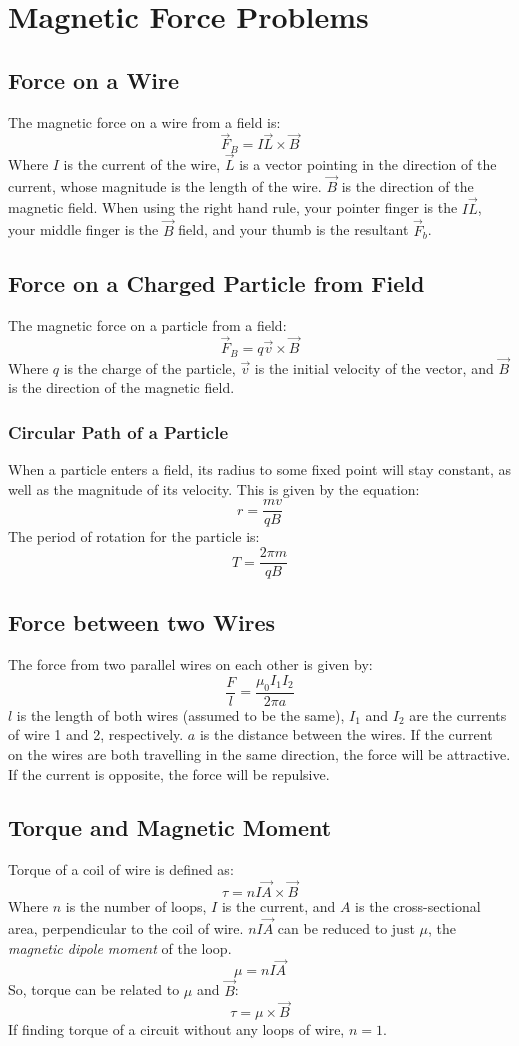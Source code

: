 \documentclass{article}
\begin{document}
\section{Magnetic Force Problems}
\subsection{Force on a Wire}
The magnetic force on a wire from a field is:
\[ \vec{F}_B = I\vec{L} \times \vec{B} \]
Where $I$ is the current of the wire, $\vec{L}$ is a vector pointing in the direction of the current, whose magnitude is the length of the wire. $\vec{B}$ is the direction of the magnetic field. When using the right hand rule, your pointer finger is the $I\vec{L}$, your middle finger is the $\vec{B}$ field, and your thumb is the resultant $\vec{F}_b$.
\subsection{Force on a Charged Particle from Field}
The magnetic force on a particle from a field:
\[ \vec{F}_B = q\vec{v} \times \vec{B} \]
Where $q$ is the charge of the particle, $\vec{v}$ is the initial velocity of the vector, and $\vec{B}$ is the direction of the magnetic field. 
\subsubsection{Circular Path of a Particle}
When a particle enters a field, its radius to some fixed point will stay constant, as well as the magnitude of its velocity.  This is given by the equation:
\[ r = \frac{mv}{qB} \]
The period of rotation for the particle is:
\[ T = \frac{2\pi m}{qB} \]
\subsection{Force between two Wires}
The force from two parallel wires on each other is given by:
\[ \frac{F}{l} = \frac{\mu_0 I_1 I_2}{2\pi a} \]
$l$ is the length of both wires (assumed to be the same), $I_1$ and $I_2$ are the currents of wire 1 and 2, respectively. $a$ is the distance between the wires.  If the current on the wires are both travelling in the same direction, the force will be attractive.  If the current is opposite, the force will be repulsive.
\subsection{Torque and Magnetic Moment}
Torque of a coil of wire is defined as:
\[ \tau = nI\vec{A} \times \vec{B} \]
Where $n$ is the number of loops, $I$ is the current, and $A$ is the cross-sectional area, perpendicular to the coil of wire.  $nI\vec{A}$ can be reduced to just $\mu$, the \textit{magnetic dipole moment} of the loop.
\[ \mu = nI\vec{A} \]
So, torque can be related to $\mu$ and $\vec{B}$:
\[ \tau = \mu \times \vec{B} \]
If finding torque of a circuit without any loops of wire, $n=1$.
\end{document}
